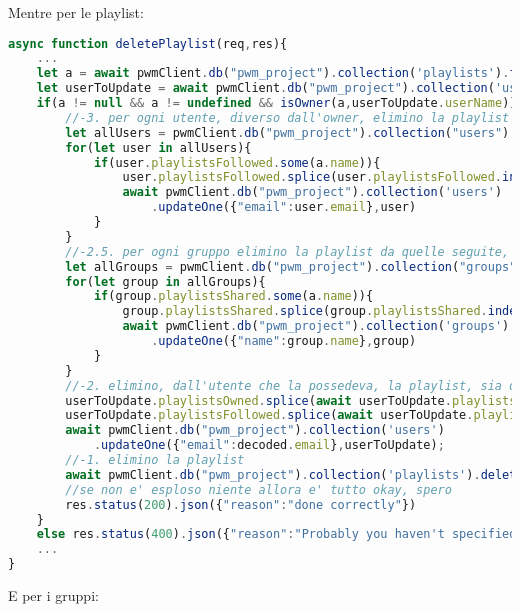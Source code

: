 Mentre per le playlist:
\begin{lstlisting}[language=Javascript]
    async function deletePlaylist(req,res){
    ...
    let a = await pwmClient.db("pwm_project").collection('playlists').findOne({"name": validator.escape(req.params.name)})
    let userToUpdate = await pwmClient.db("pwm_project").collection('users').findOne({"email":decoded.email});
    if(a != null && a != undefined && isOwner(a,userToUpdate.userName)){
        //-3. per ogni utente, diverso dall'owner, elimino la playlist da quelle seguite, laddove presente.
        let allUsers = pwmClient.db("pwm_project").collection("users").find({"email":{$not: decoded.email}})
        for(let user in allUsers){
            if(user.playlistsFollowed.some(a.name)){
                user.playlistsFollowed.splice(user.playlistsFollowed.indexOf(a.name),1)
                await pwmClient.db("pwm_project").collection('users')
                    .updateOne({"email":user.email},user)
            }
        }
        //-2.5. per ogni gruppo elimino la playlist da quelle seguite, laddove presente
        let allGroups = pwmClient.db("pwm_project").collection("groups").find({})
        for(let group in allGroups){
            if(group.playlistsShared.some(a.name)){
                group.playlistsShared.splice(group.playlistsShared.indexOf(a.name),1)
                await pwmClient.db("pwm_project").collection('groups')
                    .updateOne({"name":group.name},group)
            }
        }
        //-2. elimino, dall'utente che la possedeva, la playlist, sia da quelle seguite che da quelle totali (aka assicuro integrita' referenziale)
        userToUpdate.playlistsOwned.splice(await userToUpdate.playlistsOwned.indexOf(a.name),1)
        userToUpdate.playlistsFollowed.splice(await userToUpdate.playlistsFollowed.indexOf(a.name),1)
        await pwmClient.db("pwm_project").collection('users')
            .updateOne({"email":decoded.email},userToUpdate);
        //-1. elimino la playlist
        await pwmClient.db("pwm_project").collection('playlists').deleteOne(a)
        //se non e' esploso niente allora e' tutto okay, spero
        res.status(200).json({"reason":"done correctly"})
    }
    else res.status(400).json({"reason":"Probably you haven't specified the right params"})
    ...
}
\end{lstlisting}
E per i gruppi:
